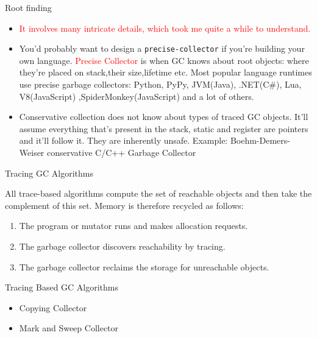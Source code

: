 \documentclass[
  10pt,
  ignorenonframetext,
]{beamer}
\providecommand{\tightlist}{%
  \setlength{\itemsep}{0pt}\setlength{\parskip}{0pt}}
\begin{document}
\begin{frame}{Root finding}
\protect\hypertarget{root-finding}{}
\pause

\begin{itemize}
\tightlist
\item
  \textcolor{red}{It involves many intricate details, which took me quite a while to understand.}
\end{itemize}

\pause

\begin{itemize}
\tightlist
\item
  You'd probably want to design a
  \texttt{precise-collector} if you're building
  your own language.
  \pause \textcolor{red}{Precise Collector} is
  when GC knows about root objects: where they're
  placed on stack,their size,lifetime etc.
  \pause Most popular language runtimes use
  precise garbage collectors: Python, PyPy,
  JVM(Java), .NET(C\#), Lua, V8(JavaScript)
  ,SpiderMonkey(JavaScript) and a lot of others.
\end{itemize}

\pause

\begin{itemize}
\tightlist
\item
  Conservative collection does not know about
  types of traced GC objects. \pause It'll assume
  everything that's present in the stack, static
  and register are pointers and it'll follow it.
  \pause They are inherently unsafe.
  \pause Example: Boehm-Demers-Weiser conservative
  C/C++ Garbage Collector
\end{itemize}
\end{frame}

\begin{frame}{Tracing GC Algorithms}
\protect\hypertarget{tracing-gc-algorithms}{}
\pause

All trace-based algorithms compute the set of
reachable objects and then take the complement of
this set. Memory is therefore recycled as follows:

\pause

\begin{enumerate}
\tightlist
\item
  The program or mutator runs and makes allocation
  requests. \pause
\item
  The garbage collector discovers reachability by
  tracing. \pause
\item
  The garbage collector reclaims the storage for
  unreachable objects.
\end{enumerate}

\pause

\begin{block}{\centering Tracing Based GC
Algorithms}
\protect\hypertarget{tracing-based-gc-algorithms}{}
\pause

\begin{itemize}
\item
  Copying Collector
\item
  Mark and Sweep Collector
\end{itemize}
\end{block}
\end{frame}
\end{document}
